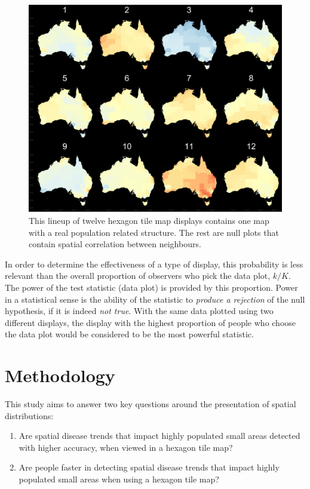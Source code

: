 \documentclass[conference,final,]{IEEEtran}
\providecommand{\tightlist}{%
  \setlength{\itemsep}{0pt}\setlength{\parskip}{0pt}}
\begin{document}
\begin{figure}
\includegraphics[width=1\linewidth]{paper_files/figure-latex/lineup-1} \caption{This lineup of twelve hexagon tile map displays contains one map with a real population related structure. The rest are null plots that contain spatial correlation between neighbours.}\label{fig:lineup}
\end{figure}

In order to determine the effectiveness of a type of display, this probability is less relevant than the overall proportion of observers who pick the data plot, \(k/K\). The power of the test statistic (data plot) is provided by this proportion. Power in a statistical sense is the ability of the statistic to \emph{produce a rejection} of the null hypothesis, if it is indeed \emph{not true}. With the same data plotted using two different displays, the display with the highest proportion of people who choose the data plot would be considered to be the most powerful statistic.

\hypertarget{methodology}{%
\section{Methodology}\label{methodology}}

This study aims to answer two key questions around the presentation of spatial distributions:

\begin{enumerate}
\def\labelenumi{\arabic{enumi}.}
\tightlist
\item
  Are spatial disease trends that impact highly populated small areas detected with higher accuracy, when viewed in a hexagon tile map?
\item
  Are people faster in detecting spatial disease trends that impact highly populated small areas when using a hexagon tile map?
\end{enumerate}
\end{document}

